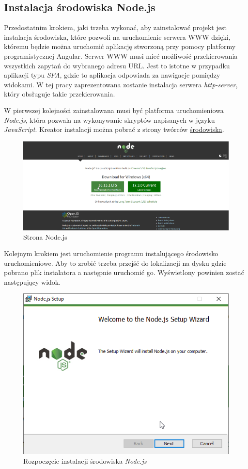 \documentclass[a4paper,twoside,12pt]{book}
\begin{document}
\subsection{Instalacja środowiska Node.js}
Przedostatnim krokiem, jaki trzeba wykonać, aby zainstalować projekt jest instalacja środowiska, które pozwoli na uruchomienie serwera WWW dzięki, któremu będzie można uruchomić aplikację stworzoną przy pomocy platformy programistycznej Angular. Serwer WWW musi mieć możliwość przekierowania wszystkich zapytań do wybranego adresu URL. Jest to istotne w przypadku aplikacji typu \textit{SPA}, gdzie to aplikacja odpowiada za nawigacje pomiędzy widokami. W tej pracy zaprezentowana zostanie instalacja serwera \textit{http-server}, który obsługuje takie przekierowania.

W pierwszej kolejności zainstalowana musi być platforma uruchomieniowa \textit{Node.js}, która pozwala na wykonywanie skryptów napisanych w języku \textit{JavaScript}. Kreator instalacji można pobrać z strony twórców \href{https://nodejs.org/en/}{środowiska}.
\begin{figure}[H]
	\centering
	\includegraphics[width=0.8\linewidth]{../zrzuty_ekranu/instalacja_nodejs/node_page}
	\caption{Strona Node.js}
	\label{fig:nodepage}
\end{figure}

Kolejnym krokiem jest uruchomienie programu instalującego środowisko uruchomieniowe. Aby to zrobić trzeba przejść do lokalizacji na dysku gdzie pobrano plik instalatora a następnie uruchomić go. Wyświetlony powinien zostać następujący widok.
\begin{figure}[h!]
	\centering
	\includegraphics[width=0.65\linewidth]{../zrzuty_ekranu/instalacja_nodejs/node1}
	\caption{Rozpoczęcie instalacji środowiska \textit{Node.js}}
	\label{fig:node1}
\end{figure}
\FloatBarrier
\end{document}
